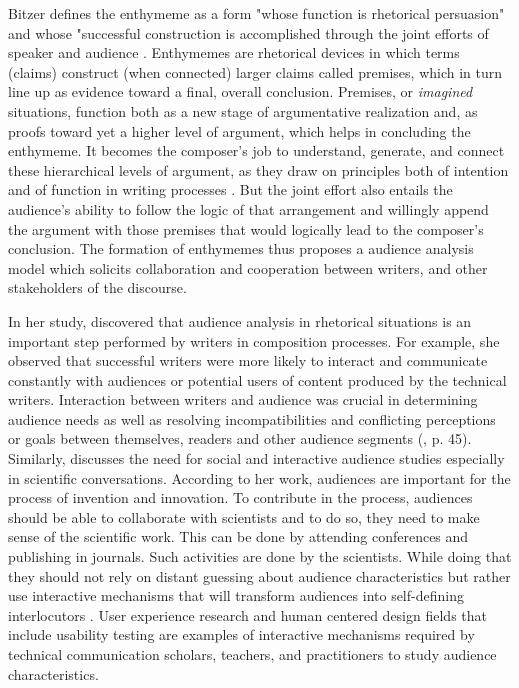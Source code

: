 Bitzer defines the enthymeme as a form "whose function is rhetorical persuasion" and whose "successful construction is accomplished through the joint efforts of speaker and audience \cite{seas2006enthymematic}. Enthymemes are rhetorical devices in which terms (claims) construct (when connected) larger claims called premises, which in turn line up as evidence toward a final, overall conclusion. Premises, or \textit{imagined} situations, function both as a new stage of argumentative realization and, as proofs toward yet a higher level of argument, which helps in concluding the enthymeme. It becomes the composer’s job to understand, generate, and connect these hierarchical levels of argument, as they draw on principles both of intention and of function in writing processes \cite{seas2006enthymematic}. But the joint effort also entails the audience's ability to follow the logic of that arrangement and willingly append the argument with those premises that would logically lead to the composer’s conclusion. The formation of enthymemes thus proposes a audience analysis model which solicits collaboration and cooperation between writers, and other stakeholders of the discourse.

In her study, \textcite{spilka1990orality} discovered that audience analysis in rhetorical situations is an important step performed by writers in composition processes. For example, she observed that successful writers were more likely to interact and communicate constantly with audiences or potential users of content produced by the technical writers. Interaction between writers and audience was crucial in determining audience needs as well as resolving incompatibilities and conflicting perceptions or goals between themselves, readers and other audience segments (\cite{spilka1990orality}, p. 45). Similarly,  \textcite{blakeslee2001bridging} discusses the need for social and interactive audience studies especially in scientific conversations. According to her work, audiences are important for the process of invention and innovation. To contribute in the process, audiences should be able to collaborate with scientists and to do so, they need to make sense of the scientific work. This can be done by attending conferences and publishing in journals. Such activities are done by the scientists. While doing that they should not rely on distant guessing about audience characteristics but rather use interactive mechanisms that will transform audiences into self-defining interlocutors \cite{blakeslee2001bridging}. User experience research and human centered design fields that include usability testing are examples of interactive mechanisms required by technical communication scholars, teachers, and practitioners to study audience characteristics.

